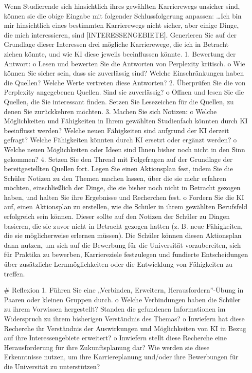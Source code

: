 \documentclass[
  ngerman,
  letterpaper,
  DIV=11]{scrreprt}
\newenvironment{Shaded}{\begin{snugshade}}{\end{snugshade}}
\newcommand{\CommentTok}[1]{\textcolor[rgb]{0.37,0.37,0.37}{#1}}
\newcommand{\FunctionTok}[1]{\textcolor[rgb]{0.28,0.35,0.67}{#1}}
\newcommand{\NormalTok}[1]{\textcolor[rgb]{0.00,0.23,0.31}{#1}}
\newcommand{\OtherTok}[1]{\textcolor[rgb]{0.00,0.23,0.31}{#1}}
\newcommand{\SpecialStringTok}[1]{\textcolor[rgb]{0.13,0.47,0.30}{#1}}
\begin{document}
\begin{tcolorbox}
\begin{Shaded}
\begin{Highlighting}[]
\NormalTok{Wenn Studierende sich hinsichtlich ihres gewählten Karrierewegs unsicher sind, können sie die obige Eingabe mit folgender Schlussfolgerung anpassen:}
\NormalTok{…Ich bin mir hinsichtlich eines bestimmten Karrierewegs nicht sicher, aber einige Dinge, die mich interessieren, sind }\CommentTok{[}\OtherTok{INTERESSENGEBIETE}\CommentTok{]}\NormalTok{. Generieren Sie auf der Grundlage dieser Interessen drei mögliche Karrierewege, die ich in Betracht ziehen könnte, und wie KI diese jeweils beeinflussen könnte.}
\SpecialStringTok{1.  }\NormalTok{Bewertung der Antwort:}
\NormalTok{o   Lesen und bewerten Sie die Antworten von Perplexity kritisch.}
\NormalTok{o   Wie können Sie sicher sein, dass sie zuverlässig sind? Welche Einschränkungen haben die Quellen? Welche Werte vertreten diese Antworten?}
\SpecialStringTok{2.  }\NormalTok{Überprüfen Sie die von Perplexity angegebenen Quellen. Sind sie zuverlässig?}
\NormalTok{o   Öffnen und lesen Sie die Quellen, die Sie interessant finden. Setzen Sie Lesezeichen für die Quellen, zu denen Sie zurückkehren möchten.}
\SpecialStringTok{3.  }\NormalTok{Machen Sie sich Notizen:}
\NormalTok{o   Welche Möglichkeiten und Fähigkeiten in Ihrem gewählten Studienfach könnten durch KI beeinflusst werden? Welche neuen Fähigkeiten sind aufgrund der KI derzeit gefragt? Welche Fähigkeiten könnten durch KI ersetzt oder ergänzt werden?}
\NormalTok{o   Welche neuen Möglichkeiten oder Ideen sind Ihnen bisher noch nicht in den Sinn gekommen?}
\SpecialStringTok{4.  }\NormalTok{Setzen Sie den Thread mit Folgefragen auf der Grundlage der bereitgestellten Quellen fort. Legen Sie einen Aktionsplan fest, indem Sie die Schüler Notizen zu den Themen machen lassen, über die sie mehr erfahren möchten, einschließlich der Dinge, die sie bisher noch nicht in Betracht gezogen haben, und halten Sie ihre Ergebnisse und Recherchen fest.}
\NormalTok{o   Fordern Sie die KI auf, einen Aktionsplan zu erstellen, wie die Schüler in ihrem gewählten Berufsfeld erfolgreich sein können. Dieser sollte auf den Notizen der Schüler zu Dingen basieren, die sie zuvor nicht in Betracht gezogen hatten (z. B. neue Fähigkeiten, die sie möglicherweise erlernen müssen). Die Schüler können diesen Aktionsplan dann nutzen, um sich auf die Bewerbung für die Universität vorzubereiten, sich für Praktika zu bewerben, Karriereziele festzulegen und fundierte Entscheidungen über zusätzliche Lernmöglichkeiten oder die Entwicklung von Fähigkeiten zu treffen.}

\FunctionTok{\# Reflexion}
\SpecialStringTok{1.  }\NormalTok{Führen Sie eine „Verbinden, Erweitern, Herausfordern”{-}Übung in Paaren oder kleinen Gruppen durch.}
\NormalTok{o   Welche Verbindungen haben die Schüler zu ihrem Vorwissen hergestellt? Standen die gefundenen Informationen im Widerspruch zu ihrem bisherigen Verständnis des Themas?}
\NormalTok{o   Inwiefern hat diese Recherche ihr Verständnis der Auswirkungen und Möglichkeiten von KI in Bezug auf ihre Interessengebiete erweitert?}
\NormalTok{o   Inwiefern stellt diese Recherche eine Herausforderung für ihre Zukunftsplanung dar? Wie werden sie diese Erkenntnisse nutzen, um ihre Karriereplanung und/oder ihre Bewerbungen für die Universität zu unterstützen?}


\end{Highlighting}
\end{Shaded}
\end{tcolorbox}
\end{document}

